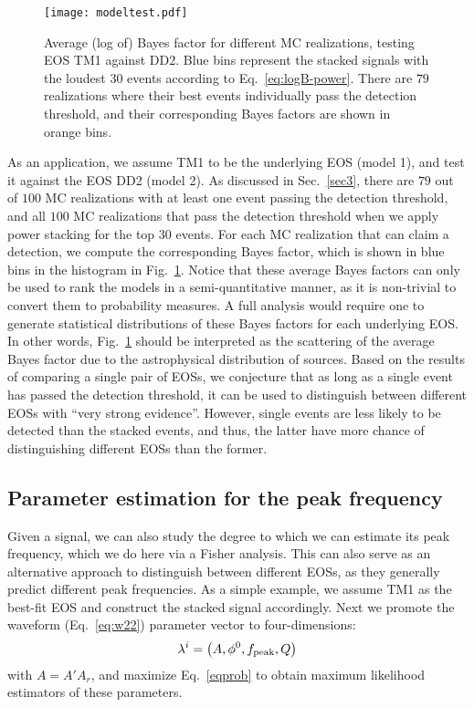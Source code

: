 \documentclass[prd,aps,floatfix,superscriptaddress,nofootinbib,twocolumn,10pt,English]{revtex4-1}
\begin{document}
\begin{figure}[tb]
\texttt{[image: modeltest.pdf]}
\caption{Average (log of) Bayes factor for different MC realizations,
  testing EOS TM1 against DD2. Blue bins represent the stacked
  signals with the loudest 30 events according to Eq.~\eqref{eq:logB-power}. There are $79$ realizations
  where their best events individually pass the detection threshold, and their
  corresponding Bayes factors are shown in orange bins. }
\label{fig:modeltest}
\end{figure}

As an application, we assume TM1 to be the underlying EOS (model 1),
and test it against the EOS DD2 (model 2). As discussed in
Sec.~\ref{sec3}, there are $79$ out of $100$ MC realizations with at least one event passing the detection threshold, and all $100$ MC realizations that pass
the detection threshold when we apply power stacking for the top $30$ events. For each MC realization that can claim a detection, we compute the corresponding Bayes factor, which is shown
in blue bins in the histogram in Fig.~\ref{fig:modeltest}.  
Notice that 
these average Bayes factors can only be used to rank the models in a
semi-quantitative manner, as it is non-trivial to convert them to
probability measures. A full analysis would require one to generate  
statistical distributions of these Bayes factors for each underlying EOS. 
In other words, Fig.~\ref{fig:modeltest} should be interpreted as the scattering of the average Bayes factor due to the astrophysical distribution of sources. Based on the results of comparing a single pair of EOSs, we conjecture that as long as a
single event has passed the detection threshold, it can be used to
distinguish between different EOSs with ``very strong evidence''. However, single
events are less likely to be detected than the stacked events, and
thus, the latter have more chance of distinguishing different EOSs
than the former. 

\subsection{Parameter estimation for the peak frequency}\label{sec4b}

Given a  signal, we can also study the degree to which we can
estimate its peak frequency, which we do here via a Fisher analysis.
This can also serve as an alternative approach to distinguish between
different EOSs, as they generally predict different peak
frequencies. As a simple example, we assume TM1 as the best-fit EOS
and construct the stacked signal accordingly. Next we promote the
waveform (Eq.~\eqref{eq:w22}) parameter vector to four-dimensions:
\begin{equation}
\lambda^i = \left(A, \phi^0, f_{\rm peak}, Q\right)
\end{equation}
with $A = A' A_r$,  and maximize
Eq.~\eqref{eqprob} to obtain maximum likelihood estimators of these
parameters. 
\end{document}
